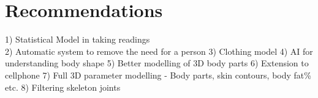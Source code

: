 \chapter{Recommendations}

1) Statistical Model in taking readings\\
2) Automatic system to remove the need for a person
3) Clothing model
4) AI for understanding body shape
5) Better modelling of 3D body parts
6) Extension to cellphone
7) Full 3D parameter modelling - Body parts, skin contours, body fat\% etc.
8) Filtering skeleton joints

